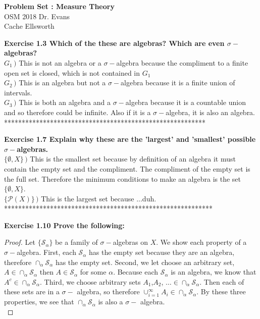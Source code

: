 \documentclass[letterpaper,12pt]{article}
\theoremstyle{definition}
\begin{document}
\begin{flushleft}
  \textbf{\large{Problem Set : Measure Theory}} \\
  OSM 2018 Dr. Evans \\
  Cache Ellsworth
  \end{flushleft}

\vspace{5mm}

\noindent\textbf{Exercise 1.3
Which of the these are algebras?  Which are even $\sigma-$algebras?}\\
\indent\textbf{$ G_1 \,)$ }This is not an algebra or a $\sigma-$algebra because the compliment to a finite open set is closed, which is not contained in $G_1$ \\
\indent\textbf{$G_2 \,)$ } This is an algebra but not a $\sigma-$algebra because it is a finite union of intervals. \\
\indent\textbf{$G_3 \,)$ } This is both an algebra and a $\sigma-$algebra because it is a countable union and so therefore could be infinite.  Also if it is a $\sigma-$algebra, it is also an algebra. *********************************************************\\

\vspace{5mm}

\noindent\textbf{Exercise 1.7
Explain why these are the 'largest' and 'smallest' possible $\sigma-$algebras.}\\
\indent\textbf{$\{\emptyset, X\}\,)$} This is the smallest set because by definition of an algebra it must contain the empty set and the compliment.  The compliment of the empty set is the full set.  Therefore the minimum conditions to make an algebra is the set $\{\emptyset, X\}$.\\
\indent \textbf{$\{\mathcal{P}(X)\}\,)$} This is the largest set because ...duh. ***********************************************************\\

\vspace{5mm}

\noindent\textbf{Exercise 1.10
Prove the following:}\\
\begin{proof}  Let $\{ \mathcal{S}_\alpha \}$ be a family of $\sigma-$algebras on $X$.  We show each property of a $\sigma-$algebra.  First, each $\mathcal{S}_\alpha$ has the empty set because they are an algebra, therefore $\cap_\alpha \mathcal{S}_\alpha$ has the empty set.  Second, we let choose an arbitrary set, $A \in \cap_\alpha \mathcal{S}_\alpha$ then $A \in \mathcal{S}_\alpha$ for some $\alpha$. Because each $\mathcal{S}_\alpha$ is an algebra, we know that $A^c \in \cap_\alpha \mathcal{S}_\alpha$.  Third, we choose arbitrary sets $A_1$,$ A_2$, $\dots \in \cap_\alpha \mathcal{S}_\alpha$.  Then each of these sets are in a $\sigma -$ algebra, so therefore $\cup_{i=1}^\infty A_i \in  \cap_\alpha \mathcal{S}_\alpha$.  By these three properties, we see that $\cap_\alpha \mathcal{S}_\alpha$ is also a $\sigma -$ algebra.\\
\end{proof}
\vspace{5mm}
\end{document}
